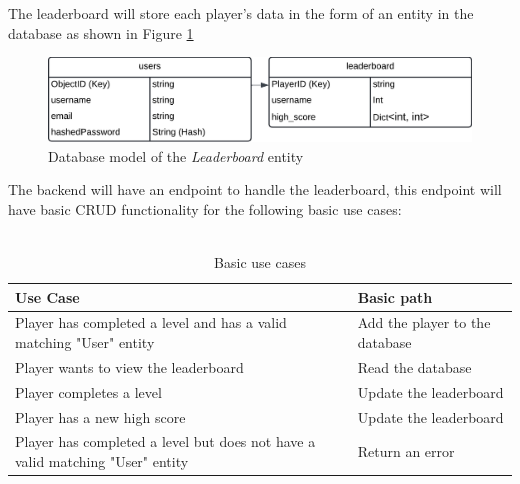 The leaderboard will store each player's data in the form of an entity in the database as shown in Figure \ref{fig:leaderboard_object}
\begin{center} 
    \begin{figure}[H]
        \centering
        \includegraphics[width=0.5\linewidth]{images/leaderboard_object.png}
        \caption{Database model of the \textit{Leaderboard} entity}    
        \label{fig:leaderboard_object}
    \end{figure}
\end{center}
The backend will have an endpoint to handle the leaderboard, this endpoint will have basic CRUD functionality for the following basic use cases:
\\\\
\begin{table}[H]
    \caption{Basic use cases}
    \begin{tabular}{|p{11cm}|p{5cm}|}
        \hline
        Use Case & Basic path\\
        \hline
        Player has completed a level and has a valid matching "User" entity & Add the player to the database\\
        \hline
        Player wants to view the leaderboard & Read the database\\
        \hline
        Player completes a level & Update the leaderboard\\
        \hline
        Player has a new high score & Update the leaderboard\\
        \hline
        Player has completed a level but does not have a valid matching "User" entity & Return an error\\
        \hline
    \end{tabular}
\end{table}

